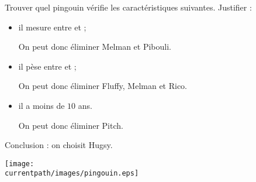     Trouver quel pingouin vérifie les caractéristiques suivantes. Justifier :
    \begin{itemize}
       \item il mesure entre  et  ;

       {\color{red} On peut donc éliminer Melman et Pibouli.}
       \item il pèse entre  et  ;

       {\color{red} On peut donc éliminer Fluffy, Melman et Rico.}
       \item il a moins de $10$ ans.

       {\color{red} On peut donc éliminer Pitch.}
    \end{itemize}

    {\red Conclusion : on choisit Hugsy}.
   \begin{center}
       \texttt{[image: \\currentpath/images/pingouin.eps]}
    \end{center}
